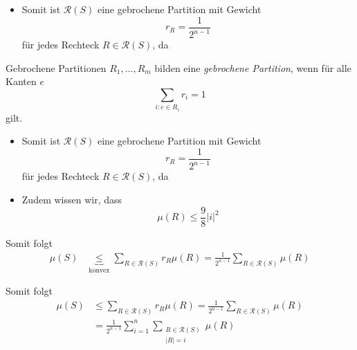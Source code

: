 \begin{frame}[t]
    \begin{itemize}
        \item Somit ist $\mathcal{R}(S)$ eine gebrochene Partition mit Gewicht
        \[
             r_R = \frac{1}{2^{n-1}}
        \]
        f\"ur jedes Rechteck $R \in \mathcal{R}(S)$, da
    \end{itemize}
    \pause
    \begin{block}{Gebrochene Partitionen}
        $R_1,\dots,R_m$ bilden eine \textit{gebrochene Partition}, wenn f\"ur alle Kanten $e$
        \[
            \sum_{i : e \in R_i} r_i = 1
        \]
        gilt.
        \end{block}
\end{frame}

\begin{frame}[t,noframenumbering]
    \begin{itemize}
        \item Somit ist $\mathcal{R}(S)$ eine gebrochene Partition mit Gewicht
        \[
             r_R = \frac{1}{2^{n-1}}
        \]
        f\"ur jedes Rechteck $R \in \mathcal{R}(S)$, da
    \end{itemize}
    \begin{itemize}
        \item Zudem wissen wir, dass
        \[
            \mu(R) \leq \frac{9}{8} |i|^2
        \]
    \end{itemize}
\end{frame}

\begin{frame}[t]{}
    Somit folgt
    \begin{align*}
        \mu(S) &\underbrace{\leq}_{\text{konvex}} \sum_{R \in \mathcal{R}(S)} r_R \mu(R) = \frac{1}{2^{n-1}} \sum_{R \in \mathcal{R}(S)} \mu(R)
    \end{align*}
\end{frame}

\begin{frame}[t, noframenumbering]{}
    Somit folgt
    \begin{align*}
        \mu(S) &\leq \sum_{R \in \mathcal{R}(S)} r_R \mu(R)= \frac{1}{2^{n-1}} \sum_{R \in \mathcal{R}(S)} \mu(R)\\
        &= \frac{1}{2^{n-1}} \sum_{i=1}^n \sum_{\substack{R \in \mathcal{R}(S)\\|R| = i}} \mu(R)
    \end{align*}
\end{frame}

